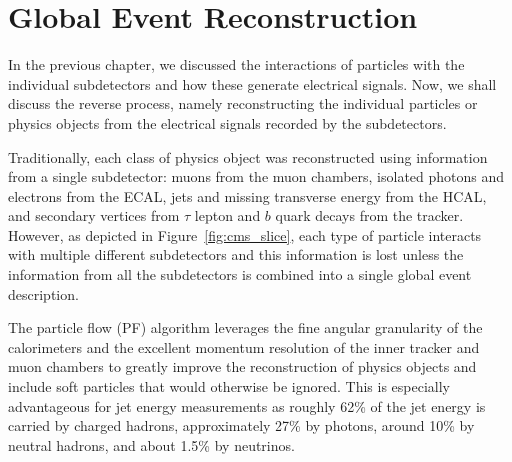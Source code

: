 \chapter{Global Event Reconstruction}

In the previous chapter, we discussed the interactions of particles with the individual subdetectors and how these generate electrical signals.
Now, we shall discuss the reverse process, namely reconstructing the individual particles or physics objects from the electrical signals recorded by the subdetectors.

Traditionally, each class of physics object was reconstructed using information from a single subdetector: muons from the muon chambers, isolated photons and electrons from the ECAL, jets and missing transverse energy from the HCAL, and secondary vertices from $\tau$ lepton and $b$ quark decays from the tracker.
However, as depicted in Figure~\ref{fig:cms_slice}, each type of particle interacts with multiple different subdetectors and this information is lost unless the information from all the subdetectors is combined into a single global event description.

The particle flow (PF) algorithm leverages the fine angular granularity of the calorimeters and the excellent momentum resolution of the inner tracker and muon chambers to greatly improve the reconstruction of physics objects and include soft particles that would otherwise be ignored.
This is especially advantageous for jet energy measurements as roughly 62\% of the jet energy is carried by charged hadrons, approximately 27\% by photons, around 10\% by neutral hadrons, and about 1.5\% by neutrinos.


